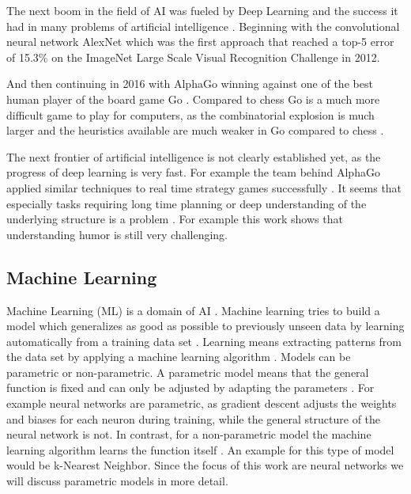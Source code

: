 \documentclass[draft,final,oneside]{vutinfth} %
\begin{document}
The next boom in the field of AI was fueled by Deep Learning and the success it had in many problems of artificial intelligence \cite{selfdriving}\cite{nmt}\cite{speech}. Beginning with the convolutional neural network AlexNet which was the first approach that reached a top-5 error of 15.3\% on the ImageNet Large Scale Visual Recognition Challenge in 2012. \cite{alexnet}

And then continuing in 2016 with AlphaGo winning against one of the best human player of the board game Go \cite{alphagopaper}. Compared to chess Go is a much more difficult game to play for computers, as the combinatorial explosion is much larger and the heuristics available are much weaker in Go compared to chess \cite{alphagopaper}.

The next frontier of artificial intelligence is not clearly established yet, as the progress of deep learning is very fast. For example the team behind AlphaGo applied similar techniques to real time strategy games successfully \cite{arulkumaran2019alphastar}. It seems that especially tasks requiring long time planning or deep understanding of the underlying structure is a problem \cite{atariplaying}. For example this work shows that understanding humor is still very challenging.


\subsection{Machine Learning}

Machine Learning (ML) is a domain of AI \cite{aimodern}. Machine learning tries to build a model which generalizes as good as possible to previously unseen data by learning automatically from a training data set \cite{bishop}. Learning means extracting patterns from the data set by applying a machine learning algorithm \cite{bishop}. Models can be parametric or non-parametric. A parametric model means that the general function is fixed and can only be adjusted by adapting the parameters \cite{aimodern}. For example neural networks are parametric, as gradient descent adjusts the weights and biases for each neuron during training, while the general structure of the neural network is not. In contrast, for a non-parametric model the machine learning algorithm learns the function itself \cite{aimodern}. An example for this type of model would be k-Nearest Neighbor.  Since the focus of this work are neural networks we will discuss parametric models in more detail.
\end{document}
